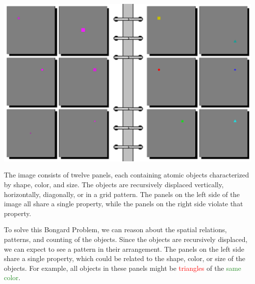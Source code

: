 \begin{tcolorbox}[breakable,enhanced jigsaw,opacityback=0,]
	\centering
	\includegraphics[width=.8\linewidth]{imgs/bongard/easy-7.png}\\
	\begin{dialogue}
		 The image consists of twelve panels, each containing atomic objects characterized by shape, color, and size. The objects are recursively displaced vertically, horizontally, diagonally, or in a grid pattern. The panels on the left side of the image all share a single property, while the panels on the right side violate that property.
		
		To solve this Bongard Problem, we can reason about the spatial relations, patterns, and counting of the objects. Since the objects are recursively displaced, we can expect to see a pattern in their arrangement. The panels on the left side share a single property, which could be related to the shape, color, or size of the objects. For example, all objects in these panels might be \textcolor{red}{triangles} of the \textcolor{ForestGreen}{same color}.
		

\end{dialogue}
\end{tcolorbox}

